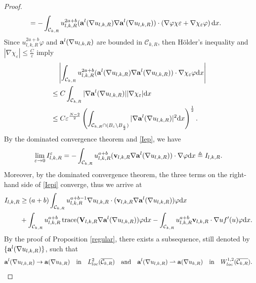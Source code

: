 \documentclass[12pt]{amsart}
\theoremstyle{definition}
\theoremstyle{remark}
\theoremstyle{conclusion}
\theoremstyle{conjecture}
\numberwithin{equation}{section}
\begin{document}
\begin{proof}
\begin{equation*}
\begin{aligned}
 &=-\int_{\mathcal{C}_{k,R}}u_{l,k,R}^{2a+b}({\bf{a}}^l(\nabla u_{l,k,R})\nabla {\bf{a}}^l(\nabla u_{l,k,R}))\cdot\left(\nabla\varphi \chi{\varepsilon}+\nabla\chi_{\varepsilon}\varphi\right) \mathrm{d}x.
  \end{aligned}
\end{equation*}
Since $u_{l,k,R}^{2a+b}\varphi$ and ${\bf{a}}^l(\nabla u_{l,k,R})$ are bounded in $\mathcal{C}_{k,R}$, then H\"older's inequality and $|\nabla \chi_{\varepsilon}|\leq\frac{C}{\varepsilon}$ imply
\begin{equation}\label{Iep}
\begin{aligned}
&\quad \left\lvert \int_{\mathcal{C}_{k,R}}u_{l,k,R}^{2a+b}({\bf{a}}^l(\nabla u_{l,k,R})\nabla {\bf{a}}^l(\nabla u_{l,k,R}))\cdot\nabla\chi_{\varepsilon}\varphi\mathrm{d}x\right\rvert \\
&\leq C\int_{\mathcal{C}_{k,R}}|\nabla {\bf{a}}^l(\nabla u_{l,k,R})||\nabla\chi_{\varepsilon}|\mathrm{d}x\\
&\leq C \varepsilon^{\frac{N-2}{2}}\left(\int_{\mathcal{C}_{k,R}\cap (B_{\varepsilon}\backslash B_{\frac{\varepsilon}{2}})} |\nabla {\bf{a}}^l(\nabla u_{l,k,R})|^2\mathrm{d}x\right)^{\frac{1}{2}}.
\end{aligned}
\end{equation}
By the dominated convergence theorem and \eqref{Iep}, we have
$$ \lim\limits_{\varepsilon\rightarrow0}I^{\varepsilon}_{l,k,R}=-\int_{\mathcal{C}_{k,R}}u_{l,k,R}^{a+b}(\mathbf{v}_{l,k,R}\nabla {\bf{a}}^l(\nabla u_{l,k,R}))\cdot\nabla\varphi\mathrm{d}x\triangleq I_{l,k,R}.$$
Moreover, by the dominated convergence theorem, the three terms on the right-hand side of \eqref{Iepi} converge, thus we arrive at
\begin{equation*}
\begin{aligned}
  I_{l,k,R}
  &\geq(a+b) \int_{\mathcal{C}_{k,R}}u_{l,k,R}^{a+b-1}\nabla u_{l,k,R}\cdot (\mathbf{v}_{l,k,R}\nabla {\bf{a}}^l(\nabla u_{l,k,R}))\varphi\mathrm{d}x\\
  &+\int_{\mathcal{C}_{k,R}}u_{l,k,R}^{a+b}\operatorname{trace}(\mathbf{V}_{l,k,R}\nabla {\bf{a}}^l(\nabla u_{l,k,R}))\varphi\mathrm{d}x
  -\int_{\mathcal{C}_{k,R}}u_{l,k,R}^{a+b}\mathbf{v}_{l,k,R}\cdot \nabla u f^{\prime}(u)\varphi\mathrm{d}x.
\end{aligned}
\end{equation*}
By the proof of Proposition \ref{regular}, there exists a subsequence, still denoted by $\{{\bf{a}}^l(\nabla u_{l,k,R})\}$, such that
\begin{equation*}
{\bf{a}}^l(\nabla u_{l,k,R})\rightarrow {\bf{a}}(\nabla u_{k,R})\quad\text{in}\quad L^2_{loc}(\overline{\mathcal{C}_{k,R}})\quad\text{and}\quad{\bf{a}}^l(\nabla u_{l,k,R})\rightharpoonup  {\bf{a}}(\nabla u_{k,R})\quad\text{in}\quad W^{1,2}_{loc}(\overline{\mathcal{C}_{k,R}}).

\end{equation*}
\end{proof}
\end{document}
